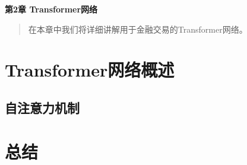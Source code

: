 \newpage
\maketitle
\begin{center}
\Large \textbf{第2章 Transformer网络} \quad 
\end{center}
\begin{abstract}
在本章中我们将详细讲解用于金融交易的Transformer网络。
\end{abstract}
\section{Transformer网络概述}
\subsection{自注意力机制}

\section{总结}